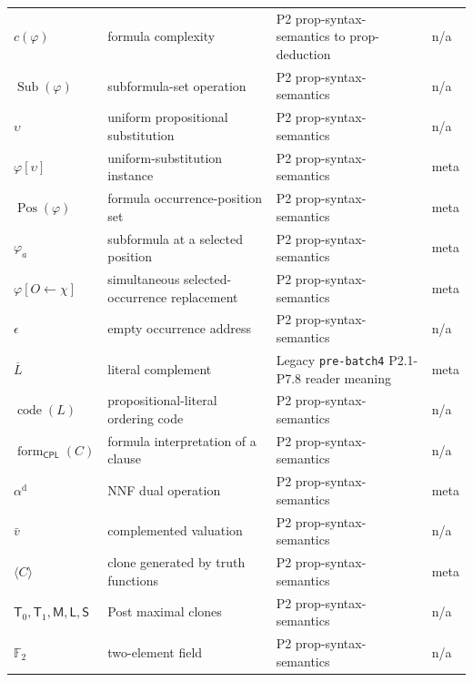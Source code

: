 \begin{longtable}{@{}p{}p{}p{}p{}@{}}
\(c(\varphi)\) & formula complexity & P2 prop-\allowbreak{}syntax-\allowbreak{}semantics to prop-\allowbreak{}deduction & n/a \\
\(\operatorname{Sub}(\varphi)\) & subformula-set operation & P2 prop-\allowbreak{}syntax-\allowbreak{}semantics & n/a \\
\(\upsilon\) & uniform propositional substitution & P2 prop-\allowbreak{}syntax-\allowbreak{}semantics & n/a \\
\(\varphi[\upsilon]\) & uniform-substitution instance & P2 prop-\allowbreak{}syntax-\allowbreak{}semantics & meta \\
\(\operatorname{Pos}(\varphi)\) & formula occurrence-position set & P2 prop-\allowbreak{}syntax-\allowbreak{}semantics & meta \\
\(\varphi_a\) & subformula at a selected position & P2 prop-\allowbreak{}syntax-\allowbreak{}semantics & meta \\
\(\varphi[O\leftarrow\chi]\) & simultaneous selected-occurrence replacement & P2 prop-\allowbreak{}syntax-\allowbreak{}semantics & meta \\
\(\epsilon\) & empty occurrence address & P2 prop-\allowbreak{}syntax-\allowbreak{}semantics & n/a \\
\(\overline L\) & literal complement & Legacy \texttt{pre-\allowbreak{}batch4} P2.\allowbreak{}1-\allowbreak{}P7.\allowbreak{}8 reader meaning & meta \\
\(\operatorname{code}(L)\) & propositional-literal ordering code & P2 prop-\allowbreak{}syntax-\allowbreak{}semantics & n/a \\
\(\operatorname{form}_{\mathsf{CPL}}(C)\) & formula interpretation of a clause & P2 prop-\allowbreak{}syntax-\allowbreak{}semantics & n/a \\
\(\alpha^{\mathrm d}\) & NNF dual operation & P2 prop-\allowbreak{}syntax-\allowbreak{}semantics & meta \\
\(\bar v\) & complemented valuation & P2 prop-\allowbreak{}syntax-\allowbreak{}semantics & n/a \\
\(\langle C\rangle\) & clone generated by truth functions & P2 prop-\allowbreak{}syntax-\allowbreak{}semantics & meta \\
\(\mathsf T_0,\allowbreak \mathsf T_1,\allowbreak \mathsf M,\allowbreak \mathsf L,\allowbreak \mathsf S\) & Post maximal clones & P2 prop-\allowbreak{}syntax-\allowbreak{}semantics & n/a \\
\(\mathbb F_2\) & two-element field & P2 prop-\allowbreak{}syntax-\allowbreak{}semantics & n/a \\

\end{longtable}
